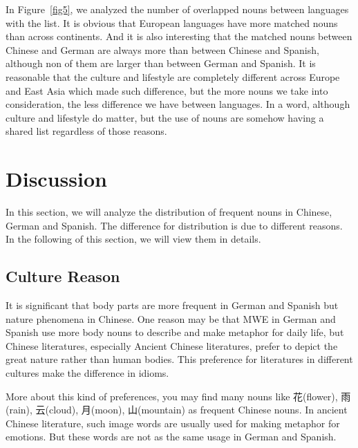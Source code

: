 In Figure~\ref{fig5}, we analyzed the number of overlapped nouns between languages with the list. It is obvious that European languages have more matched nouns than across continents. And it is also interesting that the matched nouns between Chinese and German are always more than between Chinese and Spanish, although non of them are larger than between German and Spanish. It is reasonable that the culture and lifestyle are completely different across Europe and East Asia which made such difference, but the more nouns we take into consideration, the less difference we have between languages. In a word, although culture and lifestyle do matter, but the use of nouns are somehow having a shared list regardless of those reasons. 




\section{Discussion}\label{discuss}

In this section, we will analyze the distribution of frequent nouns in Chinese, German and Spanish. The difference for distribution is due to different reasons. In the following of this section, we will view them in details. 

\subsection{Culture Reason}
It is significant that body parts are more frequent in German and Spanish but nature phenomena in Chinese. One reason may be that MWE in German and Spanish use more body nouns to describe and make metaphor for daily life, but Chinese literatures, especially Ancient Chinese literatures, prefer to depict the great nature rather than human bodies. This preference for literatures in different cultures make the difference in idioms. 

More about this kind of preferences, you may find many nouns like 花(flower), 雨(rain), 云(cloud), 月(moon), 山(mountain) as frequent Chinese nouns. In ancient Chinese literature, such image words are usually used for making metaphor for emotions. But these words are not as the same usage in German and Spanish. 

